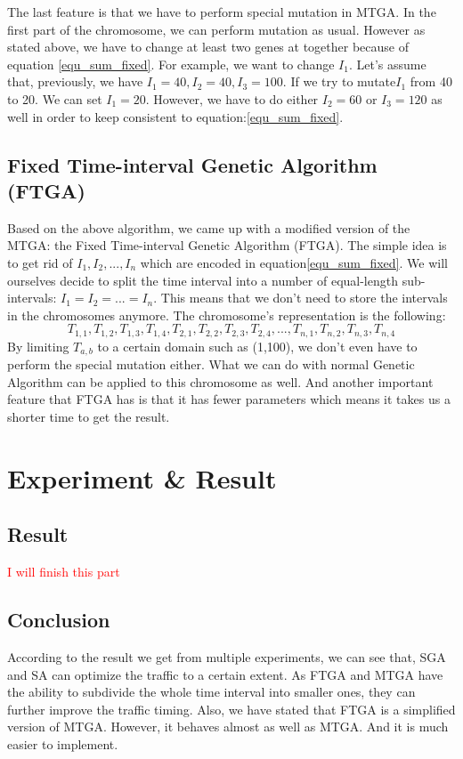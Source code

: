 \documentclass{article} %
\begin{document}
The last feature is that we have to perform special mutation in MTGA. In the first part of the chromosome, we can perform mutation as usual. However as stated above, we have to change at least two genes at together because of equation \ref{equ_sum_fixed}. For example, we want to change ${I_1}$. Let's assume that, previously, we have $I_1 = 40, I_2 = 40, I_3 = 100$. If we try to mutate$I_1$ from 40 to 20. We can set $I_1 = 20$. However, we have to do either $I_2=60$ or $I_3=120$ as well in order to keep consistent to equation:\ref{equ_sum_fixed}. 


\subsection{Fixed Time-interval Genetic Algorithm (FTGA)}
Based on the above algorithm, we came up with a modified version of the MTGA: the Fixed Time-interval Genetic Algorithm (FTGA). The simple idea is to get rid of $I_1, I_2, ..., I_n$ which are encoded in equation\ref{equ_sum_fixed}. We will ourselves decide to split the time interval into a number of equal-length sub-intervals: $I_1=I_2=...=I_n$. This means that we don't need to store the intervals in the chromosomes anymore. The chromosome's representation is the following:
\begin{equation}
T_{1,1}, T_{1,2}, T_{1,3}, T_{1,4},T_{2,1}, T_{2,2}, T_{2,3}, T_{2,4},...,T_{n,1}, T_{n, 2},T_{n,3}, T_{n, 4}
\end{equation}
By limiting $T_{a,b}$ to a certain domain such as (1,100), we don't even have to perform the special mutation either. What we can do with normal Genetic Algorithm can be applied to this chromosome as well. And another important feature that FTGA has is that it has fewer parameters which means it takes us a shorter time to get the result. 


\section{Experiment \& Result}
\subsection{Result}
\textcolor{red}{I will finish this part}
\subsection{Conclusion}
According to the result we get from multiple experiments, we can see that, SGA and SA can optimize the traffic to a certain extent. As FTGA and MTGA have the ability to subdivide the whole time interval into smaller ones, they can further improve the traffic timing. Also, we have stated that FTGA is a simplified version of MTGA. However, it behaves almost as well as MTGA. And it is much easier to implement.
\end{document}
